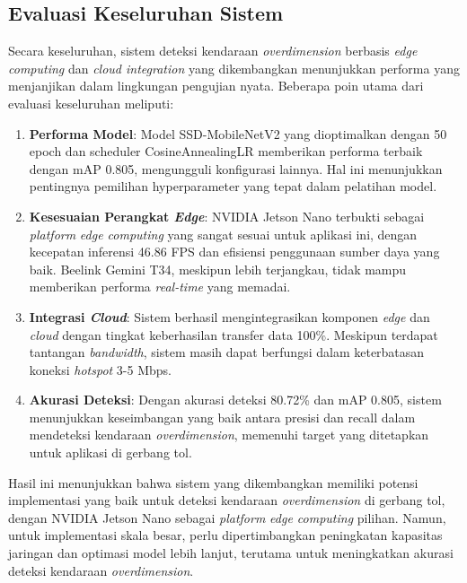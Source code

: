 \subsection{Evaluasi Keseluruhan Sistem}

Secara keseluruhan, sistem deteksi kendaraan \emph{overdimension} berbasis \emph{edge computing} dan \emph{cloud integration} yang dikembangkan menunjukkan performa yang menjanjikan dalam lingkungan pengujian nyata. Beberapa poin utama dari evaluasi keseluruhan meliputi:

\begin{enumerate}[nolistsep]
    \item \textbf{Performa Model}: Model SSD-MobileNetV2 yang dioptimalkan dengan 50 epoch dan scheduler CosineAnnealingLR memberikan performa terbaik dengan mAP 0.805, mengungguli konfigurasi lainnya. Hal ini menunjukkan pentingnya pemilihan hyperparameter yang tepat dalam pelatihan model.
    
    \item \textbf{Kesesuaian Perangkat \emph{Edge}}: NVIDIA Jetson Nano terbukti sebagai \emph{platform} \emph{edge computing} yang sangat sesuai untuk aplikasi ini, dengan kecepatan inferensi 46.86 FPS dan efisiensi penggunaan sumber daya yang baik. Beelink Gemini T34, meskipun lebih terjangkau, tidak mampu memberikan performa \emph{real-time} yang memadai.
    
    \item \textbf{Integrasi \emph{Cloud}}: Sistem berhasil mengintegrasikan komponen \emph{edge} dan \emph{cloud} dengan tingkat keberhasilan transfer data 100\%. Meskipun terdapat tantangan \emph{bandwidth}, sistem masih dapat berfungsi dalam keterbatasan koneksi \emph{hotspot} 3-5 Mbps.
    \item \textbf{Akurasi Deteksi}: Dengan akurasi deteksi 80.72\% dan mAP 0.805, sistem menunjukkan keseimbangan yang baik antara presisi dan recall dalam mendeteksi kendaraan \emph{overdimension}, memenuhi target yang ditetapkan untuk aplikasi di gerbang tol.
\end{enumerate}

Hasil ini menunjukkan bahwa sistem yang dikembangkan memiliki potensi implementasi yang baik untuk deteksi kendaraan \emph{overdimension} di gerbang tol, dengan NVIDIA Jetson Nano sebagai \emph{platform} \emph{edge computing} pilihan. Namun, untuk implementasi skala besar, perlu dipertimbangkan peningkatan kapasitas jaringan dan optimasi model lebih lanjut, terutama untuk meningkatkan akurasi deteksi kendaraan \emph{overdimension}.

